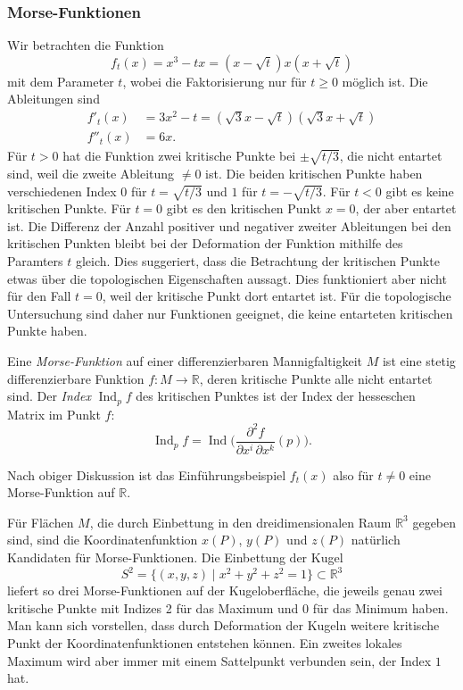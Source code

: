 \subsubsection{Morse-Funktionen}
Wir betrachten die Funktion
\[
f_t(x)
=
x^3-tx
=
(x-\!\sqrt{t})x(x+\!\sqrt{t})
\]
mit dem Parameter $t$, wobei die Faktorisierung nur für $t\ge 0$ möglich
ist.
Die Ableitungen sind
\begin{align*}
f'_t(x)
&=
3x^2-t
=
(\!\sqrt{3}x-\!\sqrt{t})
(\!\sqrt{3}x+\!\sqrt{t})
\\
f''_t(x)
&=
6x.
\end{align*}
Für $t> 0$ hat die Funktion zwei kritische Punkte bei $\pm\!\sqrt{t/3}$,
die nicht entartet sind, weil die zweite Ableitung $\ne 0$ ist.
Die beiden kritischen Punkte haben verschiedenen
Index $0$ für $t=\!\sqrt{t/3}$
und $1$ für $t=-\!\sqrt{t/3}$.
Für $t<0$ gibt es keine kritischen Punkte.
Für $t=0$ gibt es den kritischen Punkt $x=0$, der aber entartet ist.
Die Differenz der Anzahl positiver und negativer zweiter Ableitungen
bei den kritischen Punkten bleibt bei der Deformation der Funktion 
mithilfe des Paramters $t$ gleich.
Dies suggeriert, dass die Betrachtung der kritischen Punkte etwas
über die topologischen Eigenschaften aussagt.
Dies funktioniert aber nicht für den Fall $t=0$, weil der kritische
Punkt dort entartet ist.
Für die topologische Untersuchung sind daher nur Funktionen geeignet,
die keine entarteten kritischen Punkte haben.

\begin{definition}
%
Eine {\em Morse-Funktion} auf einer differenzierbaren Mannigfaltigkeit
$M$ ist eine stetig differenzierbare Funktion $f\colon M\to\mathbb{R}$,
deren kritische Punkte alle nicht entartet sind.
Der \emph{Index} $\operatorname{Ind}_pf$ des kritischen Punktes ist der Index
%
der hesseschen Matrix im Punkt $f$:
\[
\operatorname{Ind}_pf
=
\operatorname{Ind}\biggl(
\frac{\partial^2 f}{\partial x^i\,\partial x^k}(p)
\biggr).
\]
%
\end{definition}

Nach obiger Diskussion ist das Einführungsbeispiel $f_t(x)$ also für
$t\ne0$ eine Morse-Funktion auf $\mathbb{R}$.

Für Flächen $M$, die durch Einbettung in den dreidimensionalen Raum
$\mathbb{R}^3$ gegeben sind, sind die Koordinatenfunktion
$x(P)$, $y(P)$ und $z(P)$ natürlich Kandidaten für Morse-Funktionen.
Die Einbettung der Kugel
\[
S^2
=
\{ (x,y,z)\mid x^2+y^2+z^2=1 \}
\subset
\mathbb{R}^3
\]
liefert so drei Morse-Funktionen auf der Kugeloberfläche, die jeweils
genau zwei kritische Punkte mit Indizes 2 für das Maximum und
0 für das Minimum haben.
Man kann sich vorstellen, dass durch Deformation der Kugeln weitere
kritische Punkt der Koordinatenfunktionen entstehen können.
Ein zweites lokales Maximum wird aber immer mit einem Sattelpunkt
verbunden sein, der Index $1$ hat.

